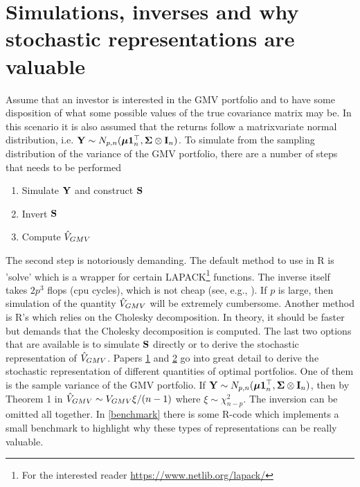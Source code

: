 \documentclass[12pt, oneside]{book}\usepackage{knitr}
\begin{document}
\section{Simulations, inverses and why stochastic representations are valuable}
Assume that an investor is interested in the GMV portfolio and to have some disposition of what some possible values of the true covariance matrix may be.
In this scenario it is also assumed that the returns follow a matrixvariate normal distribution, i.e. $\mathbf{Y} \sim N_{p,n}(\mbox{\boldmath$\mu$} \mathbf{1}_n^\top, \mathbf{\Sigma} \otimes \mathbf{I}_n)$. 
To simulate from the sampling distribution of the variance of the GMV portfolio, there are a number of steps that needs to be performed
\begin{enumerate}
  \item Simulate $\mathbf{Y}$ and construct $\mathbf{S}$
  \item Invert $\mathbf{S}$
  \item Compute $\hat{V}_{GMV}$
\end{enumerate}
The second step is notoriously demanding.
The default method to use in R is 'solve' which is a wrapper for certain LAPACK\footnote{For the interested reader \url{https://www.netlib.org/lapack/}} functions.
The inverse itself takes $2p^3$ flops (cpu cycles), which is not cheap (see, e.g., \citet[ch. 14]{higham2002accuracy}).
If $p$ is large, then simulation of the quantity $\hat{V}_{GMV}$ will be extremely cumbersome.
Another method is R's  which relies on the Cholesky decomposition. 
In theory, it should be faster but demands that the Cholesky decomposition is computed.
The last two options that are available is to simulate $\mathbf{S}$ directly or to derive the stochastic representation of $\hat{V}_{GMV}$.
Papers \hyperref[sec:paper1]{1} and \hyperref[sec:paper2]{2} go into great detail to derive the stochastic representation of different quantities of optimal portfolios. 
One of them is the sample variance of the GMV portfolio.
If $\mathbf{Y} \sim N_{p,n}(\mbox{\boldmath$\mu$} \mathbf{1}_n^\top, \mathbf{\Sigma} \otimes \mathbf{I}_n)$, then by Theorem 1 in \citet{bodnar2020sampling} $\hat{V}_{GMV} \sim V_{GMV}\xi /(n-1)$ where $\xi \sim \chi^2_{n-p}$.
The inversion can be omitted all together.
In \ref{benchmark} there is some R-code which implements a small benchmark to highlight why these types of representations can be really valuable.
\end{document}
